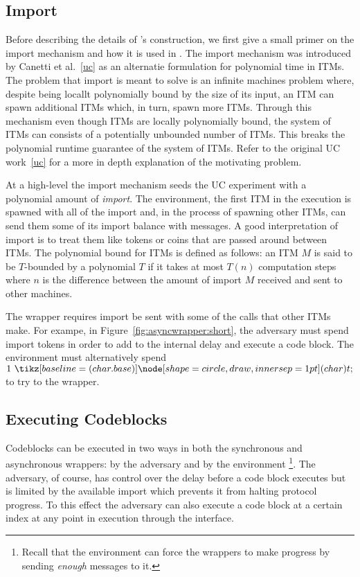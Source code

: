 \subsection{Import}
Before describing the details of \Wasync's construction, we first give a small primer on the import mechanism and how it is used in \Wasync.
The import mechanism was introduced by Canetti et al.~\ref{uc} as an alternatie formulation for polynomial time in ITMs.
The problem that import is meant to solve is an infinite machines problem where, despite being locallt polynomially bound by the size of its input, an ITM can spawn additional ITMs which, in turn, spawn more ITMs.
Through this mechanism even though ITMs are locally polynomially bound, the system of ITMs can consists of a potentially unbounded number of ITMs. 
This breaks the polynomial runtime guarantee of the system of ITMs. 
Refer to the original UC work~\ref{uc} for a more in depth explanation of the motivating problem.

At a high-level the import mechanism seeds the UC experiment with a polynomial amount of \textit{import}.
The environment, the first ITM in the execution is spawned with all of the import and, in the process of spawning other ITMs, can send them some of its import balance with messages.
A good interpretation of import is to treat them like tokens or coins that are passed around between ITMs.
The polynomial bound for ITMs is defined as follows: an ITM $M$ is said to be $T$-bounded by a polynomial $T$ if it takes at most $T(n)$ computation steps where $n$ is the difference between the amount of import $M$ received and sent to other machines.

The wrapper requires import be sent with some of the calls that other ITMs make. 
For exampe, in Figure~\ref{fig:asyncwrapper:short}, the adversary must spend import tokens in order to add to the internal delay and execute a code block.
The environment must alternatively spend $1 \token$ to try to \Advance the wrapper.

\subsection{Executing Codeblocks}
Codeblocks can be executed in two ways in both the synchronous and asynchronous wrappers: by the adversary and by the environment \footnote{Recall that the environment can force the wrappers to make progress by sending {\em enough} \Advance messages to it.}.
The adversary, of course, has control over the delay before a code block executes but is limited by the available import which prevents it from halting protocol progress.
To this effect the adversary can also execute a code block at a certain index at any point in execution through the \Exec interface.

